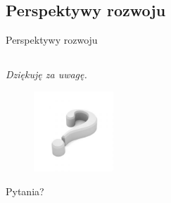 \documentclass[xcolor=x11names,compress]{beamer}
\renewcommand{\(}{\begin{columns}}
\renewcommand{\)}{\end{columns}}
\newcommand{\<}[1]{\begin{column}{#1}}
\renewcommand{\>}{\end{column}}
\begin{document}
\subsection*{Perspektywy rozwoju}
\begin{frame}{Perspektywy rozwoju}

\end{frame}


\subsection*{}
\begin{frame}{}

\it
\Large{Dziękuję za uwagę.}

\begin{figure}[h!]
\centering
\includegraphics[width=3cm]{../Common/img/qmark}
\end{figure}

\hfill\Large{Pytania?}

\end{frame}





\end{document}
